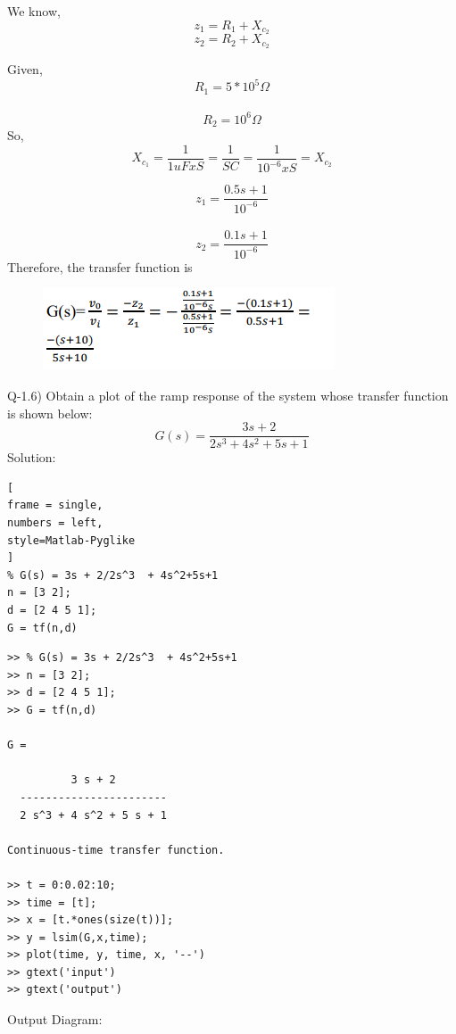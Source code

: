 \documentclass[conference]{IEEEtran}
\begin{document}
We know, 
        \[z_1 = R_1 + X_{c_{2}}\] 
        \[z_2 = R_2 + X_{c_{2}}\]

Given,
\[R_1 = 5*10^5 \Omega\] \\
\[R_2 = 10^6 \Omega\]
So,
\[X_{c_{1}} =\frac{1}{1uFx S}= \frac{1}{SC} =\frac{1}{10^{-6} x S} = X_{c_{2}}\]

\[z_1 = \frac{0.5s +1}{10^{-6}}\] \\
\[z_2 = \frac{0.1s +1 }{10^{-6}}\]
Therefore, the transfer function is
\begin{figure}[!h]
    \centering
    \includegraphics[width =\linewidth]{transff.PNG}
    \label{fig:my_label}
\end{figure}


Q-1.6) Obtain a plot of the ramp response 
of the system whose transfer function is 
shown below:
\[G(s) = \frac{3s + 2}{2s^3 + 4s^2 + 5s + 1}\]
Solution:
\begin{lstlisting}[
frame = single,
numbers = left,
style=Matlab-Pyglike
]
% G(s) = 3s + 2/2s^3  + 4s^2+5s+1
n = [3 2];
d = [2 4 5 1];
G = tf(n,d)
\end{lstlisting}
\begin{verbatim}
>> % G(s) = 3s + 2/2s^3  + 4s^2+5s+1
>> n = [3 2];
>> d = [2 4 5 1];
>> G = tf(n,d)

G =
 
          3 s + 2
  -----------------------
  2 s^3 + 4 s^2 + 5 s + 1
 
Continuous-time transfer function.

>> t = 0:0.02:10;
>> time = [t];
>> x = [t.*ones(size(t))];
>> y = lsim(G,x,time);
>> plot(time, y, time, x, '--')
>> gtext('input')
>> gtext('output')
\end{verbatim}


Output Diagram:
\end{document}
